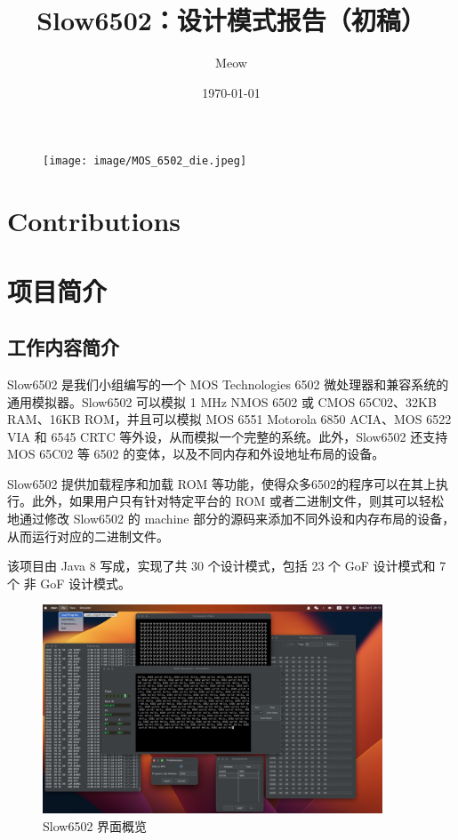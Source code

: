 \documentclass[cn,black,12pt,normal]{elegantnote}
\title{Slow6502：设计模式报告（初稿）}
\author{Meow}
\institute{软件学院}
\date{\today}
\begin{document}
\maketitle

\begin{figure}[H]
    \centering
    \texttt{[image: image/MOS\_6502\_die.jpeg]}
\end{figure}

\newpage
\section*{Contributions}



\newpage

\tableofcontents

\newpage

\section{项目简介}

\subsection{工作内容简介}

Slow6502 是我们小组编写的一个 MOS Technologies 6502 微处理器和兼容系统的通用模拟器。Slow6502 可以模拟 1 MHz NMOS 6502 或 CMOS 65C02、32KB RAM、16KB ROM，并且可以模拟 MOS 6551 Motorola 6850 ACIA、MOS 6522 VIA 和 6545 CRTC 等外设，从而模拟一个完整的系统。此外，Slow6502 还支持 MOS 65C02 等 6502 的变体，以及不同内存和外设地址布局的设备。

Slow6502 提供加载程序和加载 ROM 等功能，使得众多6502的程序可以在其上执行。此外，如果用户只有针对特定平台的 ROM 或者二进制文件，则其可以轻松地通过修改 Slow6502 的 machine 部分的源码来添加不同外设和内存布局的设备，从而运行对应的二进制文件。

该项目由 Java 8 写成，实现了共 30 个设计模式，包括 23 个 GoF 设计模式和 7 个 非 GoF 设计模式。

\begin{figure}[H]
  \centering
  \includegraphics[width=0.9\textwidth]{image/Slow6502UI.jpg}
  \caption{Slow6502 界面概览}
\end{figure}
\end{document}
